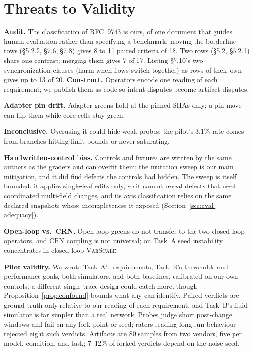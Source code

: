 \documentclass[sigconf,review,anonymous]{acmart}
\begin{document}
	\section{Threats to Validity}
	\label{sec:threats}
	
	\textbf{Audit.} The classification of RFC~9743 is ours, of one document
	that guides human evaluation rather than specifying a benchmark; moving
	the borderline rows (\S5.2.2, \S7.6, \S7.8) gives 8 to 11 paired
	criteria of 18. Two rows (\S5.2, \S5.2.1) share one contrast; merging
	them gives 7 of 17. Listing \S7.10's two synchronization clauses (harm
	when flows switch together) as rows of their own gives up to 13 of 20.
	\textbf{Construct.} Operators encode one reading of each requirement; we
	publish them as code so intent disputes become artifact disputes.
	
	\textbf{Adapter pin drift.} Adapter greens hold at the pinned SHAs only;
	a pin move can flip them while core cells stay green.
	
	\textbf{Inconclusive.} Overusing it could hide weak probes; the pilot's
	3.1\% rate comes from branches hitting limit bounds or never saturating.
	
	\textbf{Handwritten-control bias.} Controls and fixtures are written by the
	same authors as the graders and can overfit them; the mutation sweep is
	our main mitigation, and it did find defects the controls had hidden. The
	sweep is itself bounded: it applies single-leaf edits only, so it cannot
	reveal defects that need coordinated multi-field changes, and its axis
	classification relies on the same declared snapshots whose
	incompleteness it exposed (Section~\ref{sec:eval-adequacy}).
	
	\textbf{Open-loop vs.\ CRN.} Open-loop greens do not transfer to the
	two closed-loop operators, and CRN coupling is not universal; on Task~A
	seed instability concentrates in closed-loop \textsc{VarScale}.
	
	\textbf{Pilot validity.} We wrote Task~A's requirements, Task~B's
	thresholds and performance goals, both simulators, and both baselines,
	calibrated on our own controls; a different single-trace design could
	catch more, though Proposition~\ref{prop:confound} bounds what any can
	identify. Paired verdicts are ground truth only relative to our reading
	of each requirement, and Task~B's fluid simulator is far simpler than a
	real network. Probes judge short post-change windows and fail on any
	fork point or seed; raters reading long-run behaviour rejected eight
	such verdicts. Artifacts are 80 samples from two vendors, five per model,
	condition, and task; 7--12\% of forked verdicts depend on the noise
	seed.
\end{document}
